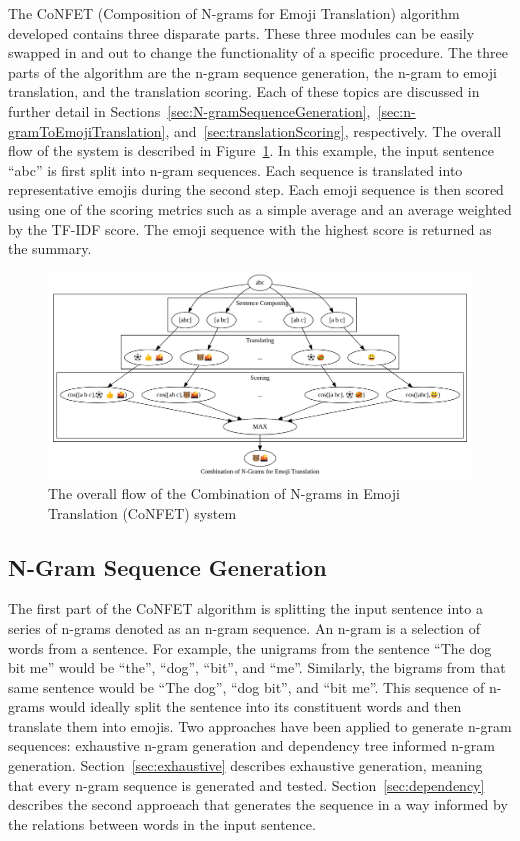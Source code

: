\documentclass{article}[10]
\begin{document}
The CoNFET (Composition of N-grams for Emoji Translation) algorithm developed contains three disparate parts. These three modules can be easily swapped in and out to change the functionality of a specific procedure. The three parts of the algorithm are the n-gram sequence generation, the n-gram to emoji translation, and the translation scoring. Each of these topics are discussed in further detail in Sections~\ref{sec:N-gramSequenceGeneration},~\ref{sec:n-gramToEmojiTranslation}, and~\ref{sec:translationScoring}, respectively. The overall flow of the system is described in Figure~\ref{fig:flow}. In this example, the input sentence ``abc'' is first split into n-gram sequences. Each sequence is translated into representative emojis during the second step. Each emoji sequence is then scored using one of the scoring metrics such as a simple average and an average weighted by the TF-IDF score. The emoji sequence with the highest score is returned as the summary.

\begin{figure}[h]
  \begin{center}
    \includegraphics[width=1.0\textwidth]{figures/flow.png}
    \caption{The overall flow of the Combination of N-grams in Emoji Translation
      (CoNFET) system\label{fig:flow}}
  \end{center}
\end{figure}

\subsection{N-Gram Sequence Generation\label{sec:N-gramSequenceGeneration}}

The first part of the CoNFET algorithm is splitting the input sentence into a series of n-grams denoted as an n-gram sequence. An n-gram is a selection of words from a sentence. For example, the unigrams from the sentence ``The dog bit me'' would be ``the'', ``dog'', ``bit'', and ``me''. Similarly, the bigrams from that same sentence would be ``The dog'', ``dog bit'', and ``bit me''. This sequence of n-grams would ideally split the sentence into its constituent words and then translate them into emojis. Two approaches have been applied to generate n-gram sequences: exhaustive n-gram generation and dependency tree informed n-gram generation. Section~\ref{sec:exhaustive} describes exhaustive generation, meaning that every n-gram sequence is generated and tested. Section~\ref{sec:dependency} describes the second approeach that generates the sequence in a way informed by the relations between words in the input sentence.
\end{document}
